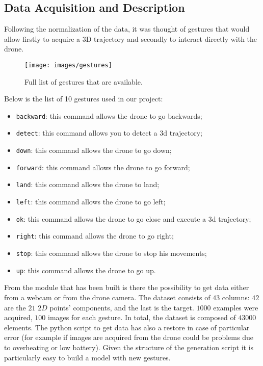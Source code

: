\subsection{Data Acquisition and Description}
\label{sec:getdata}
Following the normalization of the data, it was thought of gestures that would allow firstly to acquire a 3D trajectory and secondly to interact directly with the drone. \\

\begin{figure}[H]
	\centering
	\texttt{[image: images/gestures]}
	\caption[Full list of gestures.]{Full list of gestures that are available.}
	\label{fig:gestures}
\end{figure}

\noindent Below is the list of 10 gestures used in our project:
\begin{itemize}
	\item \texttt{backward}: this command allows the drone to go backwards;
	\item \texttt{detect}: this command allows you to detect a \gls{3d} trajectory;
	\item \texttt{down}: this command allows the drone to go down;
	\item \texttt{forward}: this command allows the drone to go forward;
	\item \texttt{land}: this command allows the drone to land;
	\item \texttt{left}: this command allows the drone to go left;
	\item \texttt{ok}: this command allows the drone to go close and execute a \gls{3d} trajectory;
	\item \texttt{right}: this command allows the drone to go right;
	\item \texttt{stop}: this command allows the drone to stop his movements;
	\item \texttt{up}: this command allows the drone to go up.
\end{itemize}

\noindent From the module that has been built is there the possibility to get data either from a webcam or from the drone camera. The dataset consists of $43$ columns: $42$ are the $21$ $2D$ points’ components, and the last is the target. $1000$ examples were acquired, $100$ images for each gesture. In total, the dataset is composed of $43000$ elements. The python script to get data has also a restore in case of particular error (for example if images are acquired from the drone could be problems due to overheating or low battery). Given the structure of the generation script it is particularly easy to build a model with new gestures.

